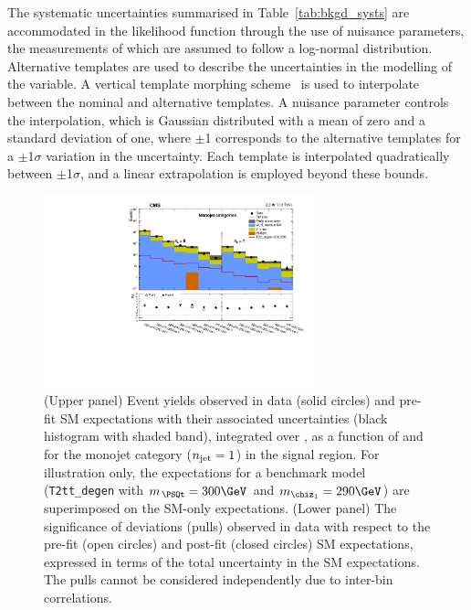 The systematic uncertainties summarised in Table~\ref{tab:bkgd_systs}
are accommodated in the likelihood function through the use of
nuisance parameters, the measurements of which are assumed to follow a
log-normal distribution. Alternative templates are used to describe
the uncertainties in the modelling of the \HTmiss variable. A vertical
template morphing scheme~\cite{Prosper:2011zz} is used to interpolate
between the nominal and alternative \HTmiss templates. A nuisance
parameter controls the interpolation, which is Gaussian distributed
with a mean of zero and a standard deviation of one, where $\pm$1
corresponds to the alternative templates for a $\pm$1$\sigma$
variation in the uncertainty. Each template is interpolated
quadratically between $\pm$1$\sigma$, and a linear extrapolation is
employed beyond these bounds.

\begin{figure}[!t]
  \begin{center}
    \includegraphics[width=0.7\textwidth]{figures/result/v4/summaryPlot_Monojet_prefit_overlay_fit_b}
    \caption{(Upper panel) Event yields observed in data (solid
      circles) and pre-fit SM expectations with their associated
      uncertainties (black histogram with shaded band), integrated
      over \HTmiss, as a function of \nb and \scalht for the monojet
      category ($n_{\text{jet}} = 1$) in the signal region. For illustration
      only, the expectations for a benchmark model
      (\texttt{T2tt\_degen} with $m_{\,\PSQt} = 300\GeV$ and
      $m_{\chiz_1} = 290\GeV$) are superimposed on the SM-only
      expectations. (Lower panel) The significance of deviations
      (pulls) observed in data with respect to the pre-fit (open
      circles) and post-fit (closed circles) SM expectations,
      expressed in terms of the total uncertainty in the SM
      expectations. The pulls cannot be considered independently due
      to inter-bin correlations.}
    \label{fig:mono}
  \end{center}
\end{figure}


